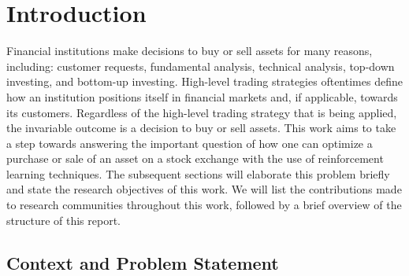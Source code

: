 \chapter{Introduction}

Financial institutions make decisions to buy or sell assets for many reasons, including: customer requests, fundamental analysis\cite{fundamental-analysis}, technical analysis\cite{technical-analysis}, top-down investing\cite{td-investing}, and bottom-up investing\cite{bu-investing}.
High-level trading strategies oftentimes define how an institution positions itself in financial markets and, if applicable, towards its customers.
Regardless of the high-level trading strategy that is being applied, the invariable outcome is a decision to buy or sell assets.
This work aims to take a step towards answering the important question of how one can optimize a purchase or sale of an asset on a stock exchange with the use of reinforcement learning techniques.
The subsequent sections will elaborate this problem briefly and state the research objectives of this work.
We will list the contributions made to research communities throughout this work, followed by a brief overview of the structure of this report.

\section{Context and Problem Statement}
\label{sec:problem-statement}

